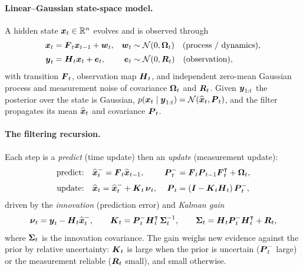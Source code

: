 \documentclass[11pt,letterpaper,logo]{yalearxiv}
\begin{document}
\paragraph{Linear--Gaussian state-space model.}
A hidden state $\boldsymbol{x}_t\in\mathbb{R}^n$ evolves and is observed through
\begin{equation}
\begin{aligned}
  \boldsymbol{x}_t &= \boldsymbol{F}_t \boldsymbol{x}_{t-1} + \boldsymbol{w}_t,
  & \boldsymbol{w}_t &\sim \mathcal N(0,\boldsymbol{\Omega}_t)\quad\text{(process / dynamics)},\\[2pt]
  \boldsymbol{y}_t &= \boldsymbol{H}_t \boldsymbol{x}_t + \boldsymbol{e}_t,
  & \boldsymbol{e}_t &\sim \mathcal N(0,\boldsymbol{R}_t)\quad\text{(observation)},
\end{aligned}
\label{eq:kf-ssm}
\end{equation}
with transition $\boldsymbol{F}_t$, observation map $\boldsymbol{H}_t$, and independent zero-mean Gaussian
process and measurement noise of covariance $\boldsymbol{\Omega}_t$ and $\boldsymbol{R}_t$. Given $\boldsymbol{y}_{1:t}$ the
posterior over the state is Gaussian, $p(\boldsymbol{x}_t\mid \boldsymbol{y}_{1:t})=\mathcal N(\widehat{\boldsymbol{x}}_t,\boldsymbol{P}_t)$, and the
filter propagates its mean $\widehat{\boldsymbol{x}}_t$ and covariance $\boldsymbol{P}_t$.

\paragraph{The filtering recursion.}
Each step is a \emph{predict} (time update) then an \emph{update} (measurement update):
\begin{equation}
\begin{aligned}
  \text{predict:}\quad & \widehat{\boldsymbol{x}}_t^- = \boldsymbol{F}_t \widehat{\boldsymbol{x}}_{t-1},
  & \boldsymbol{P}_t^- &= \boldsymbol{F}_t \boldsymbol{P}_{t-1} \boldsymbol{F}_t^{\intercal} + \boldsymbol{\Omega}_t,\\[2pt]
  \text{update:}\quad  & \widehat{\boldsymbol{x}}_t = \widehat{\boldsymbol{x}}_t^- + \boldsymbol{K}_t\,\boldsymbol{\nu}_t,
  & \boldsymbol{P}_t &= (\boldsymbol{I} - \boldsymbol{K}_t \boldsymbol{H}_t)\,\boldsymbol{P}_t^-,
\end{aligned}
\label{eq:kf-rec}
\end{equation}
driven by the \emph{innovation} (prediction error) and \emph{Kalman gain}
\begin{equation}
  \boldsymbol{\nu}_t = \boldsymbol{y}_t - \boldsymbol{H}_t \widehat{\boldsymbol{x}}_t^-, \qquad
  \boldsymbol{K}_t = \boldsymbol{P}_t^- \boldsymbol{H}_t^{\intercal}\,\boldsymbol{\Sigma}_t^{-1}, \qquad
  \boldsymbol{\Sigma}_t = \boldsymbol{H}_t \boldsymbol{P}_t^- \boldsymbol{H}_t^{\intercal} + \boldsymbol{R}_t ,
  \label{eq:kf-gain}
\end{equation}
where $\boldsymbol{\Sigma}_t$ is the innovation covariance. The gain weighs new evidence against
the prior by relative uncertainty: $\boldsymbol{K}_t$ is large when the prior is uncertain ($\boldsymbol{P}_t^-$
large) or the measurement reliable ($\boldsymbol{R}_t$ small), and small otherwise.
\end{document}
